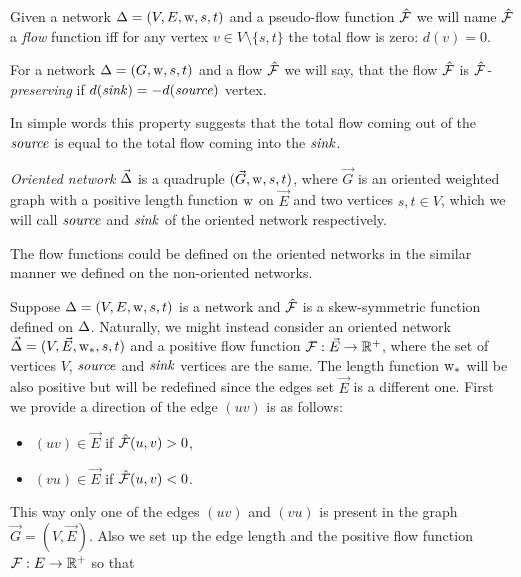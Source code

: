 \documentclass[12pt]{article}
\begin{document}
    \begin{definition}
      Given a network $\Delta = (V, E, \mathrm{w}, s, t)$ and a pseudo-flow function $\mathcal{\hat{F}}$ we will name $\mathcal{\hat{F}}$ a
        \emph{flow} function iff for any vertex $v \in V \setminus \{s,t\}$ the total flow is zero: $d(v) = 0$.
    \end{definition}
    \begin{definition}
      For a network $\Delta = (G, \mathrm{w}, s, t)$ and a flow $\mathcal{\hat{F}}$ we will say,
      that the flow $\mathcal{\hat{F}}$ is \emph{$\mathcal{\hat{F}}$-preserving} if $d(\mathit{sink}) = -d(\mathit{source})$ vertex.
    \end{definition}
    \begin{note}
      In simple words this property suggests
        that the total flow coming out of the $\mathit{source}$ is equal to the total flow
        coming into the $\mathit{sink}$.
    \end{note}
    \begin{definition}
      \emph{Oriented network} $\vec{\Delta}$ is a quadruple $(\vec{G}, \mathrm{w}, s, t)$, where
        $\vec{G}$ is an oriented weighted graph with
        a positive length function $\mathrm{w}$ on $\vec{E}$ and two vertices $s, t \in V$, which
        we will call $\mathit{source}$ and $\mathit{sink}$ of the oriented network respectively.
    \end{definition}
    \begin{note}
      The flow functions could be defined on the oriented networks in the similar manner
      we defined on the non-oriented networks.
    \end{note}
    Suppose $\Delta = (V, E, \mathrm{w}, s, t)$ is a network and $\mathcal{\hat{F}}$ is a skew-symmetric function defined
    on $\Delta$.
    Naturally, we might instead consider an oriented network $\vec{\Delta} = (V, \vec{E}, \mathrm{w}_{*}, s, t)$ and a 
      positive flow function $\mathcal{F}: \vec{E} \to \mathbb{R}^{+}$, where
      the set of vertices $V$, $\mathit{source}$ and $\mathit{sink}$ vertices are the same.
    The length function $\mathrm{w}_{*}$ will be also positive but will be redefined since the edges set $\vec{E}$ is a different one.
    First we provide a direction of the edge $(uv)$ is as follows:
    \begin{itemize}
      \item $(uv) \in \vec{E}$ if $\mathcal{\hat{F}}(u, v) > 0$,
      \item $(vu) \in \vec{E}$ if $\mathcal{\hat{F}}(u, v) < 0$.
    \end{itemize}
    This way only one of the edges $(uv)$ and $(vu)$ is present in the graph $\vec{G} = (V, \vec{E})$.
    Also we set up the edge length and the positive flow function $\mathcal{F}: E \to \mathbb{R}^{+}$ so that
\end{document}
